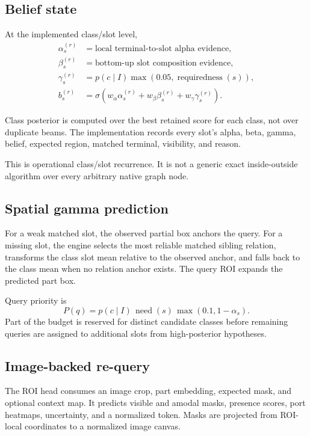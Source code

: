\documentclass[11pt]{article}
\begin{document}
\subsection{Belief state}

At the implemented class/slot level,
\begin{align*}
\alpha_s^{(r)} &= \text{local terminal-to-slot alpha evidence},\\
\beta_s^{(r)} &= \text{bottom-up slot composition evidence},\\
\gamma_s^{(r)} &= p(c\mid I)\max(0.05,\operatorname{requiredness}(s)),\\
b_s^{(r)} &= \sigma\left(
w_\alpha\alpha_s^{(r)}+w_\beta\beta_s^{(r)}+w_\gamma\gamma_s^{(r)}
\right).
\end{align*}

Class posterior is computed over the best retained score for each class, not over
duplicate beams. The implementation records every slot's alpha, beta, gamma,
belief, expected region, matched terminal, visibility, and reason.

This is operational class/slot recurrence. It is not a generic exact
inside-outside algorithm over every arbitrary native graph node.

\subsection{Spatial gamma prediction}

For a weak matched slot, the observed partial box anchors the query. For a missing
slot, the engine selects the most reliable matched sibling relation, transforms the
class slot mean relative to the observed anchor, and falls back to the class mean
when no relation anchor exists. The query ROI expands the predicted part box.

Query priority is
\[
P(q)=p(c\mid I)\,\operatorname{need}(s)\,
\max(0.1,1-\alpha_s).
\]
Part of the budget is reserved for distinct candidate classes before remaining
queries are assigned to additional slots from high-posterior hypotheses.

\subsection{Image-backed re-query}

The ROI head consumes an image crop, part embedding, expected mask, and optional
context map. It predicts visible and amodal masks, presence scores, port heatmaps,
uncertainty, and a normalized token. Masks are projected from ROI-local coordinates
to a normalized image canvas.
\end{document}
